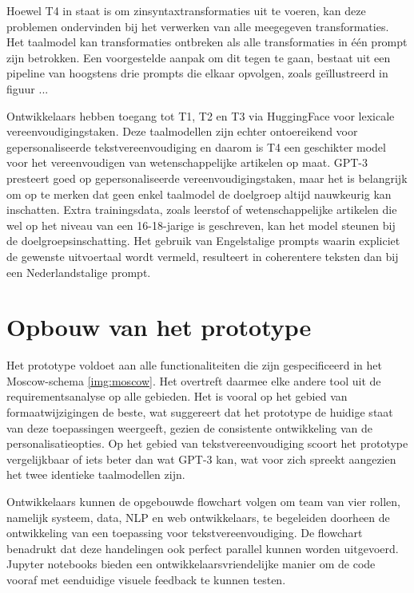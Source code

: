 \medspace

Hoewel T4 in staat is om zinsyntaxtransformaties uit te voeren, kan deze problemen ondervinden bij het verwerken van alle meegegeven transformaties. Het taalmodel kan transformaties ontbreken als alle transformaties in één prompt zijn betrokken. Een voorgestelde aanpak om dit tegen te gaan, bestaat uit een pipeline van hoogstens drie prompts die elkaar opvolgen, zoals geïllustreerd in figuur ...

\medspace

Ontwikkelaars hebben toegang tot T1, T2 en T3 via HuggingFace voor lexicale vereenvoudigingstaken. Deze taalmodellen zijn echter ontoereikend voor gepersonaliseerde tekstvereenvoudiging en daarom is T4 een geschikter model voor het vereenvoudigen van wetenschappelijke artikelen op maat. GPT-3 presteert goed op gepersonaliseerde vereenvoudigingstaken, maar het is belangrijk om op te merken dat geen enkel taalmodel de doelgroep altijd nauwkeurig kan inschatten. Extra trainingsdata, zoals leerstof of wetenschappelijke artikelen die wel op het niveau van een 16-18-jarige is geschreven, kan het model steunen bij de doelgroepsinschatting. Het gebruik van Engelstalige prompts waarin expliciet de gewenste uitvoertaal wordt vermeld, resulteert in coherentere teksten dan bij een Nederlandstalige prompt.

\section{Opbouw van het prototype}

Het prototype voldoet aan alle functionaliteiten die zijn gespecificeerd in het Moscow-schema \ref{img:moscow}. Het overtreft daarmee elke andere tool uit de requirementsanalyse op alle gebieden. Het is vooral op het gebied van formaatwijzigingen de beste, wat suggereert dat het prototype de huidige staat van deze toepassingen weergeeft, gezien de consistente ontwikkeling van de personalisatieopties. Op het gebied van tekstvereenvoudiging scoort het prototype vergelijkbaar of iets beter dan wat GPT-3 kan, wat voor zich spreekt aangezien het twee identieke taalmodellen zijn.

\medspace

Ontwikkelaars kunnen de opgebouwde flowchart volgen om team van vier rollen, namelijk systeem, data, NLP en web ontwikkelaars, te begeleiden doorheen de ontwikkeling van een toepassing voor tekstvereenvoudiging. De flowchart benadrukt dat deze handelingen ook perfect parallel kunnen worden uitgevoerd. Jupyter notebooks bieden een ontwikkelaarsvriendelijke manier om de code vooraf met eenduidige visuele feedback te kunnen testen.

